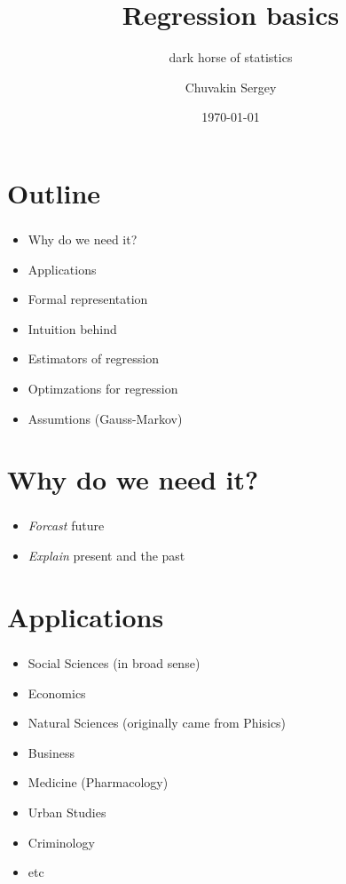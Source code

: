 \documentclass[t, 11pt]{beamer}
\title {Regression basics}
\subtitle{dark horse of statistics}
\author{Chuvakin Sergey}
\date{\today}
\institute[<<Anthropology and Sociology major>>]{<<School of Advanced Studies>>}
\begin{document}
	
	\frame[plain]{\titlepage}		
	
	\section{Outline}
	
		\begin{frame} 
			\frametitle{\insertsection} 
			\begin{itemize}
				\item Why do we need it?
				\item Applications
				\item Formal representation
				\item Intuition behind
				\item Estimators of regression
				\item Optimzations for regression
				\item Assumtions (Gauss-Markov)
			\end{itemize}
\end{frame}
	
	\section{Why do we need it?}
	
	\begin{frame}
		\frametitle{\insertsection} 
		\framesubtitle{\insertsubsection} 
			
			\begin{itemize}
				\item \emph{Forcast} future 
				\item \emph{Explain} present and the past
				\end{itemize}
		
	\end{frame}		

	\section{Applications}

\begin{frame}
	\frametitle{\insertsection} 
	\framesubtitle{\insertsubsection} 
	
	\begin{itemize}
		\item Social Sciences (in broad sense)
		\item Economics
		\item Natural Sciences (originally came from Phisics)
		\item Business 
		\item Medicine (Pharmacology)
		\item Urban Studies
		\item Criminology
		\item etc
	\end{itemize}
	
\end{frame}		
\end{document}
